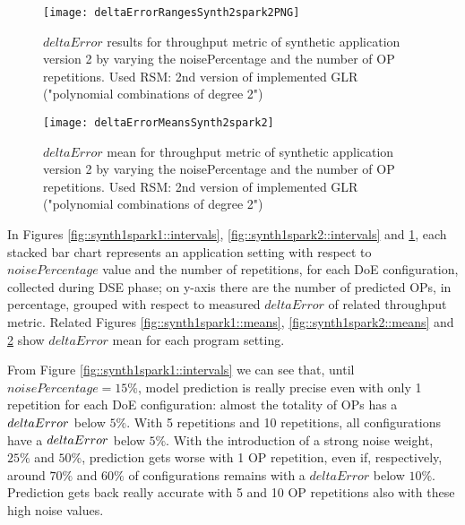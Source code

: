 \begin{figure}[htb]

    \centering
    
    \texttt{[image: deltaErrorRangesSynth2spark2PNG]}
    
     \caption{$deltaError$ results for throughput metric of synthetic application version 2 by varying the noisePercentage and the number of OP repetitions. Used RSM: 2nd version of implemented GLR ("polynomial combinations of degree 2")}
    
    \label{fig::synth2spark2::intervals}
    
\end{figure}

\begin{figure}[htb]

    \centering
    
    \texttt{[image: deltaErrorMeansSynth2spark2]}
    
    \caption{$deltaError$ mean for throughput metric of synthetic application version 2 by varying the noisePercentage and the number of OP repetitions. Used RSM: 2nd version of implemented GLR ("polynomial combinations of degree 2")}
    
    \label{fig::synth2spark2::means}
    
\end{figure}





In Figures \ref{fig::synth1spark1::intervals}, \ref{fig::synth1spark2::intervals} and \ref{fig::synth2spark2::intervals}, each stacked bar chart represents an application setting with respect to $noisePercentage$ value and the number of repetitions, for each DoE configuration, collected during DSE phase; on y-axis there are the number of predicted OPs, in percentage, grouped with respect to measured $deltaError$ of related throughput metric. Related Figures \ref{fig::synth1spark1::means}, \ref{fig::synth1spark2::means} and \ref{fig::synth2spark2::means} show $deltaError$ mean for each program setting.

From Figure \ref{fig::synth1spark1::intervals} we can see that, until $noisePercentage = 15\%$, model prediction is really precise even with only 1 repetition for each DoE configuration: almost the totality of OPs has a $del\-ta\-Er\-ror$ below $5\%$. With 5 repetitions and 10 repetitions, all configurations have a $del\-ta\-Er\-ror$ below $5\%$. With the introduction of a strong noise weight, $25\%$ and $50\%$, prediction gets worse with 1 OP repetition, even if, respectively, around $70\%$ and $60\%$ of configurations remains with a $deltaError$ below $10\%$. Prediction gets back really accurate with 5 and 10 OP repetitions also with these high noise values.

